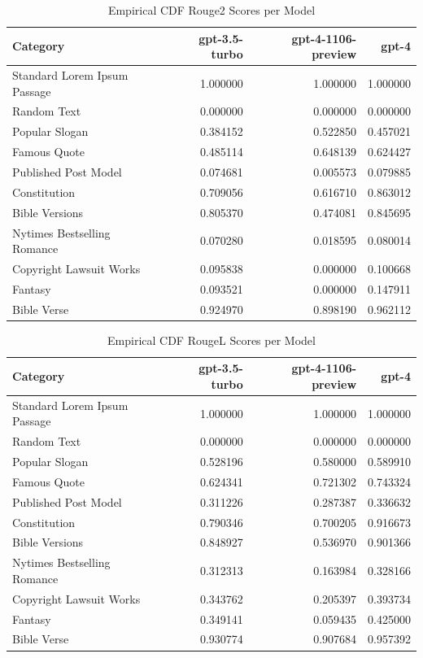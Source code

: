 \documentclass{article}
\begin{document}
\begin{table}[htbp]
    \centering
    \caption{Empirical CDF Rouge2 Scores per Model}
    \begin{tabular}{lrrr}
    \toprule
    Category & gpt-3.5-turbo & gpt-4-1106-preview & gpt-4 \\
    \midrule
    Standard Lorem Ipsum Passage & 1.000000 & 1.000000 & 1.000000 \\
    Random Text & 0.000000 & 0.000000 & 0.000000 \\
    Popular Slogan & 0.384152 & 0.522850 & 0.457021 \\
    Famous Quote & 0.485114 & 0.648139 & 0.624427 \\
    Published Post Model & 0.074681 & 0.005573 & 0.079885 \\
    Constitution & 0.709056 & 0.616710 & 0.863012 \\
    Bible Versions & 0.805370 & 0.474081 & 0.845695 \\
    Nytimes Bestselling Romance & 0.070280 & 0.018595 & 0.080014 \\
    Copyright Lawsuit Works & 0.095838 & 0.000000 & 0.100668 \\
    Fantasy & 0.093521 & 0.000000 & 0.147911 \\
    Bible Verse & 0.924970 & 0.898190 & 0.962112 \\
    \bottomrule
    \end{tabular}
\end{table}

\begin{table}[htbp]
    \centering
    \caption{Empirical CDF RougeL Scores per Model}
    \begin{tabular}{lrrr}
    \toprule
    Category & gpt-3.5-turbo & gpt-4-1106-preview & gpt-4 \\
    \midrule
    Standard Lorem Ipsum Passage & 1.000000 & 1.000000 & 1.000000 \\
    Random Text & 0.000000 & 0.000000 & 0.000000 \\
    Popular Slogan & 0.528196 & 0.580000 & 0.589910 \\
    Famous Quote & 0.624341 & 0.721302 & 0.743324 \\
    Published Post Model & 0.311226 & 0.287387 & 0.336632 \\
    Constitution & 0.790346 & 0.700205 & 0.916673 \\
    Bible Versions & 0.848927 & 0.536970 & 0.901366 \\
    Nytimes Bestselling Romance & 0.312313 & 0.163984 & 0.328166 \\
    Copyright Lawsuit Works & 0.343762 & 0.205397 & 0.393734 \\
    Fantasy & 0.349141 & 0.059435 & 0.425000 \\
    Bible Verse & 0.930774 & 0.907684 & 0.957392 \\
    \bottomrule
    \end{tabular}
\end{table}
\end{document}
